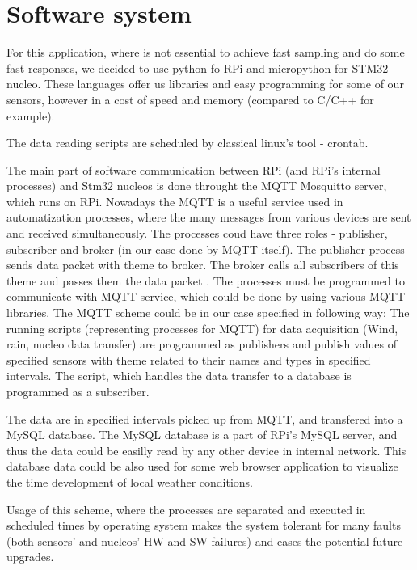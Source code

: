 
\section{Software system}
For this application, where is not essential to achieve fast sampling and do some fast responses, we decided to use python fo RPi and micropython for STM32 nucleo. These languages offer us libraries and easy programming for some of our sensors, however in a cost of speed and memory (compared to C/C++ for example).
\par
The data reading scripts are scheduled by classical linux's tool - crontab.


\par
The main part of software communication between RPi (and RPi's internal processes) and Stm32 nucleos is done throught the MQTT Mosquitto server, which runs on RPi. Nowadays the MQTT is a useful service used in automatization processes, where the many messages from various devices are sent and received simultaneously. The processes coud have three roles - publisher, subscriber and broker (in our case done by MQTT itself). The publisher process sends data packet with theme to broker. The broker calls all subscribers of this theme and passes them the data packet \cite{MqttServ}. The processes must be programmed to communicate with MQTT service, which could be done by using various MQTT libraries. The MQTT scheme could be in our case specified in following way: The running scripts (representing processes for MQTT) for data acquisition (Wind, rain, nucleo data transfer) are programmed as publishers and publish values of specified sensors with theme related to their names and types in specified intervals. The script, which handles the data transfer to a database is programmed as a subscriber.


\par
The data are in specified intervals picked up from MQTT, and transfered into a MySQL database. The MySQL database is a part of RPi's MySQL server, and thus the data could be easilly read by any other device in internal network. This database data could be also used for some web browser application to visualize the time development of local weather conditions.

\par

Usage of this scheme, where the processes are separated and executed in scheduled times by operating system makes the system tolerant for many faults (both sensors' and nucleos' HW and SW failures) and eases the potential future upgrades.


